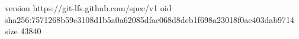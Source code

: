 version https://git-lfs.github.com/spec/v1
oid sha256:7571268b59e3108d1b5a0a62085dfae068d8dcb1f698a23018f0ac403dab9714
size 43840
